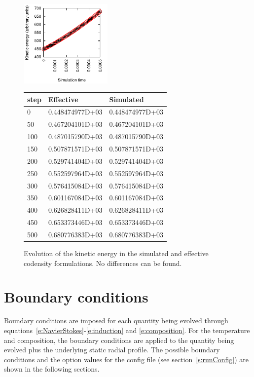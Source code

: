\documentclass[a4paper,10pt]{book}
\begin{document}
\begin{figure}[htb]
\includegraphics[width=0.4\textwidth]{figs/CodensityTestEk}
\small
\begin{tabular}[b]{l|l|l}
 step & Effective & Simulated \\ \hline
  0 & 0.448474977D+03& 0.448474977D+03\\
 50 & 0.467204101D+03& 0.467204101D+03\\
100 & 0.487015790D+03& 0.487015790D+03\\
150 & 0.507871571D+03& 0.507871571D+03\\
200 & 0.529741404D+03& 0.529741404D+03\\
250 & 0.552597964D+03& 0.552597964D+03\\
300 & 0.576415084D+03& 0.576415084D+03\\
350 & 0.601167084D+03& 0.601167084D+03\\
400 & 0.626828411D+03& 0.626828411D+03\\
450 & 0.653373446D+03& 0.653373446D+03\\
500 & 0.680776383D+03& 0.680776383D+03
\end{tabular}
 \caption{Evolution of the kinetic energy in the simulated and effective
 codensity formulations. No differences can be found.}
 \label{f:testDD}
\end{figure}

\section{Boundary conditions}
\label{s:boundaryConditions}
Boundary conditions are imposed for each quantity being evolved through
equations~\ref{e:NavierStokes}-\ref{e:induction} and \ref{e:composition}.
For the temperature and composition, the boundary conditions are applied to the
quantity being evolved plus the underlying static radial profile. The possible
boundary conditions and the option values for the config file (see
section~\ref{s:runConfig}) are shown in the following sections.
\end{document}
